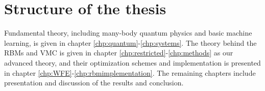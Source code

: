\section{Structure of the thesis}
Fundamental theory, including many-body quantum physics and basic machine learning, is given in chapter \ref{chp:quantum}-\ref{chp:systems}. The theory behind the RBMs and VMC is given in chapter \ref{chp:restricted}-\ref{chp:methods} as our advanced theory, and their optimization schemes and implementation is presented in chapter \ref{chp:WFE}-\ref{chp:rbmimplementation}. The remaining chapters include presentation and discussion of the results and conclusion.
